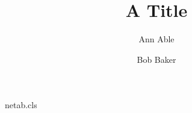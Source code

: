 \begin{filecontents*}[overwrite]{netab.cls}
\def\AB@names{}\def\AB@affillist{}
\renewcommand\author[2][]{\g@addto@macro\AB@names{#2$^{#1}$, }}
\newcommand\affil[2][]{\g@addto@macro\AB@affillist{\\$^{#1}$#2}}
\renewcommand\@author{\AB@names\AB@affillist}
\end{filecontents*}
\documentclass{netab}

\title{A Title}
\author[1]{Ann Able}
\author[1]{Bob Baker}
\maketitle
Text.

